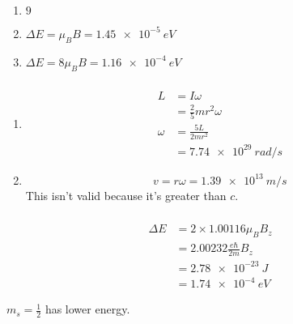 \documentclass{article}
\begin{document}
\setcounter{subsubsection}{20}
\subsubsection{}

\begin{enumerate}
  \item $9$

  \item $\Delta E = \mu_B B = \qty{1.45e-5}{eV}$

  \item $\Delta E = 8 \mu_B B = \qty{1.16e-4}{eV}$
\end{enumerate}

\setcounter{subsubsection}{22}
\subsubsection{}

\begin{enumerate}
  \item

        \begin{align*}
          L      & = I \omega                 \\
                 & = \frac{2}{5} m r^2 \omega \\
          \omega & = \frac{5 L}{2 m r^2}      \\
                 & = \qty{7.74e29}{rad/s}
        \end{align*}

  \item \[v = r \omega = \qty{1.39e13}{m/s}\] This isn't valid because it's greater than $c$.
\end{enumerate}

\setcounter{subsubsection}{24}
\subsubsection{}

\begin{align*}
  \Delta E & = 2 \times 1.00116 \mu_B B_z      \\
           & = 2.00232 \frac{e \hbar}{2 m} B_z \\
           & = \qty{2.78e-23}{J}               \\
           & = \qty{1.74e-4}{eV}
\end{align*}

$m_s = \frac{1}{2}$ has lower energy.

\setcounter{subsubsection}{26}
\end{document}
